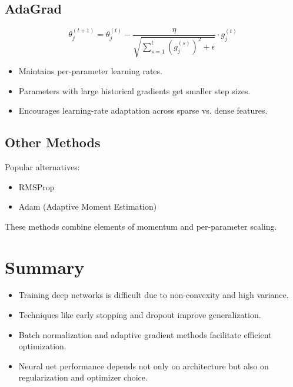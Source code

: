 \documentclass[11pt]{article}
\begin{document}
\subsection{AdaGrad}

\[
\theta_j^{(t+1)} = \theta_j^{(t)} - \frac{\eta}{\sqrt{\sum_{s=1}^t (g_j^{(s)})^2 + \epsilon}} \cdot g_j^{(t)}
\]

\begin{itemize}
    \item Maintains per-parameter learning rates.
    \item Parameters with large historical gradients get smaller step sizes.
    \item Encourages learning-rate adaptation across sparse vs. dense features.
\end{itemize}

\subsection{Other Methods}

Popular alternatives:
\begin{itemize}
    \item RMSProp
    \item Adam (Adaptive Moment Estimation)
\end{itemize}

These methods combine elements of momentum and per-parameter scaling.

\section{Summary}

\begin{itemize}
    \item Training deep networks is difficult due to non-convexity and high variance.
    \item Techniques like early stopping and dropout improve generalization.
    \item Batch normalization and adaptive gradient methods facilitate efficient optimization.
    \item Neural net performance depends not only on architecture but also on regularization and optimizer choice.
\end{itemize}
\end{document}
